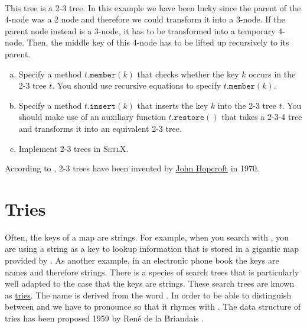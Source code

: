 \\[0.2cm]
This tree is a 2-3 tree.  In this example we have been lucky since the parent of the 4-node was
a 2 node and therefore we could transform it into a 3-node.  If the parent node instead is a 3-node,
it has to be transformed into a temporary 4-node.  Then, the middle key of this 4-node has to be
lifted up recursively to its parent.  
\begin{enumerate}[(a)]
\item Specify a method $t.\mathtt{member}(k)$ that checks whether the key $k$ occurs in the 2-3 tree
      $t$.  You should use recursive equations to specify  $t.\mathtt{member}(k)$.
\item Specify a method $t.\mathtt{insert}(k)$ that inserts the key $k$ into the 2-3 tree
      $t$.  You should make use of an auxiliary function $t.\mathtt{restore}()$ that takes a 2-3-4
      tree and transforms it into an equivalent 2-3 tree.
\item Implement 2-3 trees in \textsc{SetlX}.
\end{enumerate}
According to \cite{cormen:09}, 2-3 trees have been invented by
\href{https://en.wikipedia.org/wiki/John_Hopcroft}{John Hopcroft} in 1970.



\section{Tries}
Often, the keys of a map are strings.  For example, when you search with 
\href{https://www.google.com}{}, you are using
a string as a key to lookup information that is stored in a gigantic map provided by 
.
As another example, in an electronic phone book the keys are names and therefore strings.  
There is a species of search trees that is particularly well adapted to the case that the keys are
strings.  These search trees are known as \href{https://en.wikipedia.org/?title=Trie}{tries}.  
The name is derived from the word
.  In order to be able to distinguish between  and
 we have to pronounce    so that it rhymes with .   The data
structure of tries has been proposed 1959 by Ren\'e de la Briandais \cite{briandais:59}.

